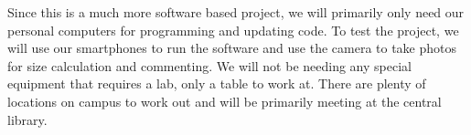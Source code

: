 Since this is a much more software based project, we will primarily only need our personal computers for programming and updating code. To test the project, we will use our smartphones to run the software and use the camera to take photos for size calculation and commenting. We will not be needing any special equipment that requires a lab, only a table to work at. There are plenty of locations on campus to work out and will be primarily meeting at the central library.